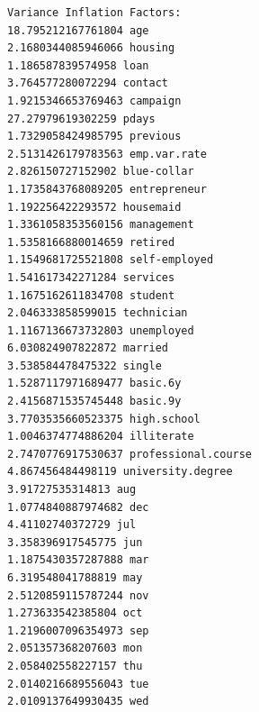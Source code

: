 \documentclass[8pt,onecolumn,aps,pra]{revtex4-1}
\begin{document}
    \begin{Verbatim}[commandchars=\\\{\}]
Variance Inflation Factors:
18.795212167761804 age
2.1680344085946066 housing
1.186587839574958 loan
3.764577280072294 contact
1.9215346653769463 campaign
27.27979619302259 pdays
1.7329058424985795 previous
2.5131426179783563 emp.var.rate
2.826150727152902 blue-collar
1.1735843768089205 entrepreneur
1.192256422293572 housemaid
1.3361058353560156 management
1.5358166880014659 retired
1.1549681725521808 self-employed
1.541617342271284 services
1.1675162611834708 student
2.046333858599015 technician
1.1167136673732803 unemployed
6.030824907822872 married
3.538584478475322 single
1.5287117971689477 basic.6y
2.4156871535745448 basic.9y
3.7703535660523375 high.school
1.0046374774886204 illiterate
2.7470776917530637 professional.course
4.867456484498119 university.degree
3.91727535314813 aug
1.0774840887974682 dec
4.41102740372729 jul
3.358396917545775 jun
1.1875430357287888 mar
6.319548041788819 may
2.5120859115787244 nov
1.273633542385804 oct
1.2196007096354973 sep
2.051357368207603 mon
2.058402558227157 thu
2.0140216689556043 tue
2.0109137649930435 wed

    \end{Verbatim}
\end{document}
